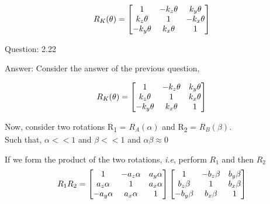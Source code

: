 \documentclass[a4paper]{article}
\begin{document}
\begin{qalist}
			\begin{equation}
				{R}_{K}(\theta) = 
				\left[ \begin{matrix} 
					\textit{$1$} & \textit{$ - {k}_{z}\theta$} & \textit{${k}_{y}\theta$} \\
					\textit{${k}_{z}\theta$} & \textit{$1$} & \textit{$-{k}_{x}\theta$} \\
					\textit{$- {k}_{y}\theta$} & \textit{${k}_{x}\theta$} & \textit{$1$} \\
				\end{matrix} \right]
			\end{equation}
			

		\item[Question: 2.22] \setcounter{equation}{0}
		\item[Answer:]
			Consider the answer of the previous question, 
			
			\begin{equation}
				{R}_{K}(\theta) = 
				\left[ \begin{matrix} 
					\textit{$1$} & \textit{$ - {k}_{z}\theta$} & \textit{${k}_{y}\theta$} \\
					\textit{${k}_{z}\theta$} & \textit{$1$} & \textit{${k}_{x}\theta$} \\
					\textit{$- {k}_{y}\theta$} & \textit{${k}_{x}\theta$} & \textit{$1$} \\
				\end{matrix} \right]
			\end{equation}
			
			Now, consider two rotations R\textsubscript{1} = ${R}_{A}(\alpha)$ and R\textsubscript{2} = ${R}_{B}(\beta)$.
			\\Such that, $\alpha << 1$ and $\beta <<1$ and $\alpha\beta \approx 0$
			
			If we form the product of the two rotations, \textit{i.e}, perform ${R}_{1}$ and then ${R}_{2}$
			\begin{equation}
				{R}_{1}{R}_{2} = 
				\left[ \begin{matrix} 
					\textit{$1$} & \textit{$ - {a}_{z}\alpha$} & \textit{${a}_{y}\alpha$} \\
					\textit{${a}_{z}\alpha$} & \textit{$1$} & \textit{${a}_{x}\alpha$} \\
					\textit{$- {a}_{y}\alpha$} & \textit{${a}_{x}\alpha$} & \textit{$1$}
				\end{matrix} \right]
				\left[ \begin{matrix} 
					\textit{$1$} & \textit{$ - {b}_{z}\beta$} & \textit{${b}_{y}\beta$} \\
					\textit{${b}_{z}\beta$} & \textit{$1$} & \textit{${b}_{x}\beta$} \\
					\textit{$- {b}_{y}\beta$} & \textit{${b}_{x}\beta$} & \textit{$1$}
				\end{matrix} \right]
			\end{equation}
			

\end{qalist}
\end{document}
